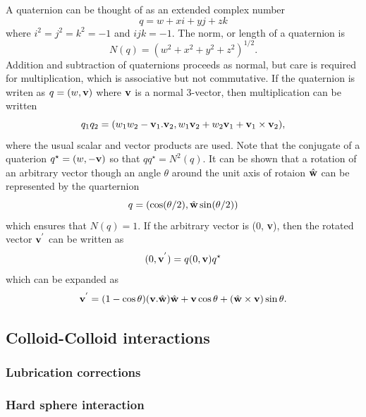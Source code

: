 A quaternion can be thought of as an extended complex number
\begin{equation}
q = w + xi + yj + zk
\end{equation}
where $i^2 = j^2 = k^2 = -1$ and $ijk = -1$. The norm, or length
of a quaternion is
\begin{equation}
N(q) = (w^2 + x^2 + y^2 + z^2)^{1/2}.
\end{equation}
Addition and subtraction of quaternions proceeds as normal, but
care is required for multiplication, which is associative but not
commutative. If the quaternion is writen as $q = (w, {\bf v})$ where
$\bf{v}$ is a normal 3-vector, then multiplication can be written
\begin{equation}
q_1 q_2 = (w_1 w_2 - {\bf v}_1 . {\bf v}_2, w_1 {\bf v}_2 + w_2 {\bf v}_1
+ {\bf v}_1 \times {\bf v}_2),
\end{equation}
where the usual scalar and vector products are used. Note that the
conjugate of a quaterion $q^\star = (w, -{\bf v})$ so that
$qq^\star = N^2(q)$.
It can be shown that a rotation of an arbitrary vector though an
angle $\theta$ around the unit axis of rotaion $\hat{\bf w}$ can
be represented by the quarternion
\begin{equation}
q = (\cos(\theta/2), \hat{\bf w} \sin(\theta/2))
\end{equation}
which ensures that $N(q) = 1$. If the arbitrary vector is (0, {\bf v}),
then the rotated vector ${\bf v}^{'}$ can be written as
\begin{equation}
(0, {\bf v}^{'}) = q (0, {\bf v}) q^\star
\end{equation}
which can be expanded as
\begin{equation}
{\bf v}^{'} = (1 - \cos\theta)({\bf v}.{\hat{\bf w}) \hat{\bf w} +
{\bf v}\cos\theta} + (\hat{\bf w} \times {\bf v})\sin\theta.  
\end{equation}


\subsection{Colloid-Colloid interactions}

\subsubsection{Lubrication corrections}

\subsubsection{Hard sphere interaction}

